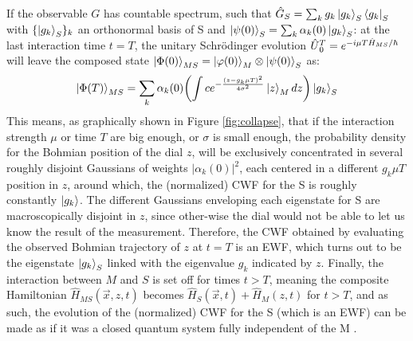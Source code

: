 \documentclass[11pt, a4paper]{article} %
\begin{document}
If the observable $G$ has countable spectrum, such that $\hat{G}_S=\sum_k g_k \ket{g_k}_S\bra{g_k}_S$ with $\{\ket{g_k}_S\}_k$ an orthonormal basis of S and $\ket{\psi(0)}_S=\sum_k \alpha_k(0)\ket{g_k}_S$: at the last interaction time $t=T$, the unitary Schrödinger evolution $\hat{U} \null_{0}^T=e^{-i\mu T \hat{H}_{MS}/\hbar}$ will leave the composed state $\ket{\Phi(0)}_{MS}=\ket{\varphi(0)}_M\otimes\ket{\psi(0)}_S$ as:\vspace{-0.1cm}
\begin{equation}\label{postM1}
\ket{\Phi(T)}_{MS}=\sum_k \alpha_k(0)\qty(\int c e^{-\frac{(z-g_k\mu T)^2}{4\sigma^2}}\ket{z}_M dz )\ket{g_k}_S
\end{equation}
This means, as graphically shown in Figure \ref{fig:collapse}, that if the interaction strength $\mu$ or time $T$ are big enough, or $\sigma$ is small enough, the probability density for the Bohmian position of the dial $z$, will be exclusively concentrated in several roughly disjoint Gaussians of weights $|\alpha_k(0)|^2$, each centered in a different $g_k \mu T$ position in $z$, around which, the (normalized) CWF for the S is roughly constantly $\ket{g_k}$. The different Gaussians enveloping each eigenstate for S are macroscopically disjoint in $z$, since other-wise the dial would not be able to let us know the result of the measurement. Therefore, the CWF obtained by evaluating the observed Bohmian trajectory of $z$ at $t=T$ is an EWF, which turns out to be the eigenstate $\ket{g_k}_S$ linked with the eigenvalue $g_k$ indicated by $z$. Finally, the interaction between $M$ and $S$ is set off for times $t>T$, meaning the composite Hamiltonian $\hat{H}_{MS}(\vec{x},z,t)$ becomes $\hat{H}_S(\vec{x},t)+\hat{H}_M(z,t)$ for $t>T$, and as such, the evolution of the (normalized) CWF for the S (which is an EWF) can be made as if it was a closed quantum system fully independent of the M \cite{JordiXavier}. 

\end{document}
